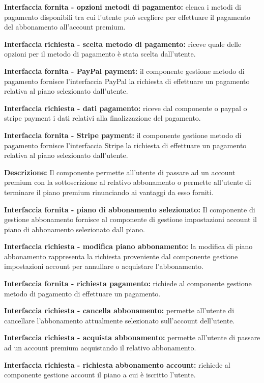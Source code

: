 \begin{listaPersonale}[]{}
    \textbf{Interfaccia fornita - opzioni metodi di pagamento:} elenca i metodi di pagamento disponibili tra cui l'utente può scegliere per effettuare il pagamento del abbonamento all'account premium.

    \textbf{Interfaccia richiesta - scelta metodo di pagamento:} riceve quale delle opzioni per il metodo di pagamento è stata scelta dall'utente.

    \textbf{Interfaccia fornita - PayPal payment:} il componente gestione metodo di pagamento fornisce l'interfaccia PayPal la richiesta di effettuare un pagamento relativa al piano selezionato dall'utente.

    \textbf{Interfaccia richiesta - dati pagamento:} riceve dal componente o paypal o stripe payment i dati relativi alla finalizzazione del pagamento.

    \textbf{Interfaccia fornita - Stripe payment:}  il componente gestione metodo di pagamento fornisce l'interfaccia Stripe la richiesta di effettuare un pagamento relativa al piano selezionato dall'utente.



    \textbf{Descrizione:} Il componente permette all'utente di passare ad un account premium con la sottoscrizione al relativo abbonamento o permette all'utente di terminare il piano premium rinunciando ai vantaggi da esso forniti.

    \textbf{Interfaccia fornita - piano di abbonamento selezionato:} Il componente di gestione abbonamento fornisce al componente di gestione impostazioni account il piano di abbonamento selezionato dall piano.

    \textbf{Interfaccia richiesta - modifica piano abbonamento:} la modifica di piano abbonamento rappresenta la richiesta proveniente dal componente gestione impostazioni account per annullare o acquistare l'abbonamento.

    \textbf{Interfaccia fornita - richiesta pagamento:} richiede al componente gestione metodo di pagamento di effettuare un pagamento.

    \textbf{Interfaccia richiesta - cancella abbonamento:} permette all'utente di cancellare l'abbonamento attualmente selezionato sull'account dell'utente.

    \textbf{Interfaccia richiesta - acquista abbonamento:} permette all'utente di passare ad un account premium acquistando il relativo abbonamento.

    \textbf{Interfaccia richiesta - richiesta abbonamento account:} richiede al componente gestione account il piano a cui è iscritto l'utente.


\end{listaPersonale}
